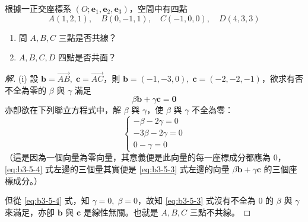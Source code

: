 \begin{example}[論例 1]
根據一正交座標系 $(O; \mathbf{e}_1, \mathbf{e}_2, \mathbf{e}_3)$，空間中有四點
\[ A(1, 2, 1),\quad B(0, -1, 1),\quad C(-1, 0, 0),\quad D(4, 3, 3) \]
\begin{enumerate}[label=(\roman*), leftmargin=2.5em]
  \item 問 $A, B, C$ 三點是否共線？
  \item $A, B, C, D$ 四點是否共面？
\end{enumerate}
\end{example}
\begin{proof}[解]
(i) 設 $\mathbf{b} = \vec{AB},\; \mathbf{c} = \vec{AC}$，則 $\mathbf{b} = (-1, -3, 0),\; \mathbf{c} = (-2, -2, -1)$，欲求有否不全為零的 $\beta$ 與 $\gamma$ 滿足
\begin{equation}
\beta \mathbf{b} + \gamma \mathbf{c} = \mathbf{0} \label{eq:b3-5-3}
\end{equation}
亦卽欲在下列聯立方程式中，解 $\beta$ 與 $\gamma$，使 $\beta$ 與 $\gamma$ 不全為零：
\begin{equation}
\begin{cases}
-\beta - 2\gamma = 0 \\
-3\beta - 2\gamma = 0 \\
0 - \gamma = 0
\end{cases} \label{eq:b3-5-4}
\end{equation}
（這是因為一個向量為零向量，其意義便是此向量的每一座標成分都應為 0，\eqref{eq:b3-5-4} 式左邊的三個量其實便是 \eqref{eq:b3-5-3} 式左邊的向量 $\beta \mathbf{b} + \gamma \mathbf{c}$ 的三個座標成分。）

但從 \eqref{eq:b3-5-4} 式，知 $\gamma = 0,\; \beta = 0$，故知 \eqref{eq:b3-5-3} 式沒有不全為 0 的 $\beta$ 與 $\gamma$ 來滿足，亦卽 $\mathbf{b}$ 與 $\mathbf{c}$ 是線性無關。也就是 $A, B, C$ 三點不共線。


\end{proof}

